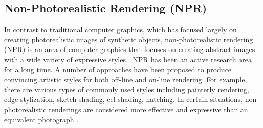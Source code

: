 


\subsection{Non-Photorealistic Rendering (NPR)}
In contrast to traditional computer graphics, which has focused largely on creating photorealistic images of synthetic objects, non-photorealistic rendering (NPR) is an area of computer graphics that focuses on creating abstract images with a wide variety of expressive styles \cite{haeberli_paint_1990}. NPR has been an active research area for a long time. A number of approaches have been proposed to produce convincing artistic styles for both off-line and on-line rendering. For example, there are various types of commonly used styles including painterly rendering, edge stylization, sketch-shading, cel-shading, hatching.
In certain situations, non-photorealistic renderings are considered more effective and expressive than an equivalent photograph \cite{healey_perceptually_2004}.



